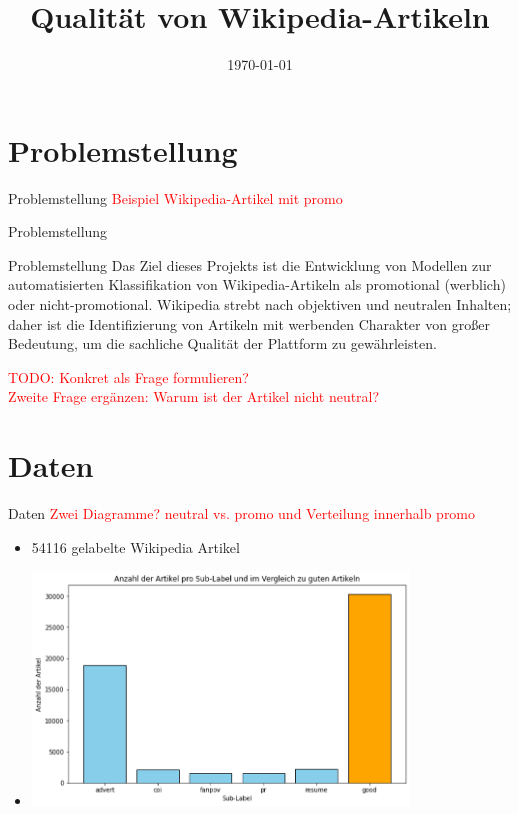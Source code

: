 \documentclass[aspectratio=169]{beamer} %
\title{Qualit\"at von Wikipedia-Artikeln}
\institute{Artificial Intelligence Group,\\
University of Hagen, Germany}
\date{\today}
\begin{document}




\begin{frame}
    \titlepage
\end{frame}
\nologo

\section{Problemstellung}

\begin{frame}{Problemstellung}
    \textcolor{red}{Beispiel Wikipedia-Artikel mit promo}
\end{frame}

\begin{frame}{Problemstellung}
    \begin{block}{Problemstellung}
        Das Ziel dieses Projekts ist die Entwicklung von Modellen zur automatisierten Klassifikation von Wikipedia-Artikeln als promotional (werblich) oder nicht-promotional. Wikipedia strebt nach objektiven und neutralen Inhalten; daher ist die Identifizierung von Artikeln mit werbenden Charakter von gro\ss{}er Bedeutung, um die sachliche Qualit\"at der Plattform zu gew\"ahrleisten.
    \end{block}
    \textcolor{red}{TODO: Konkret als Frage formulieren?\\ Zweite Frage ergänzen: Warum ist der Artikel nicht neutral?}
\end{frame}

\section{Daten}

\begin{frame}{Daten}
    \textcolor{red}{Zwei Diagramme? neutral vs. promo und Verteilung innerhalb promo}
    \begin{itemize}
        \item 54116 gelabelte Wikipedia Artikel

        \item \includegraphics[width=10cm]{figures/distribution_multiple_classes.png}
    \end{itemize}
\end{frame}
\end{document}
